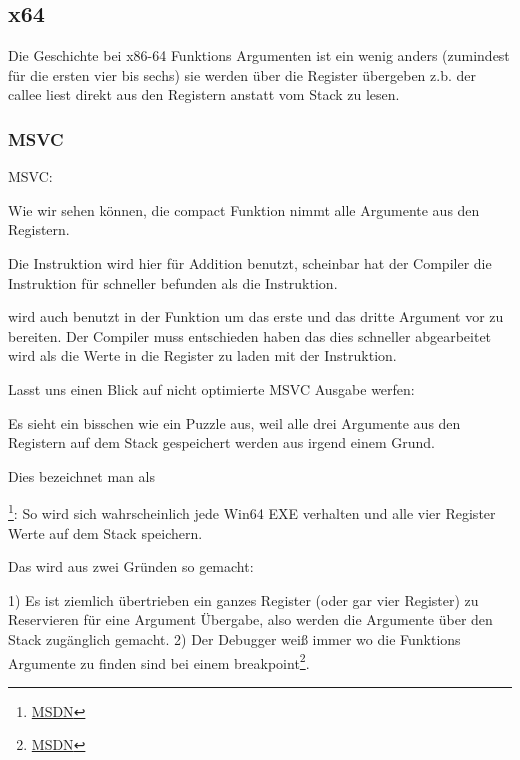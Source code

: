\subsection{x64}


Die Geschichte bei x86-64 Funktions Argumenten ist ein wenig anders (zumindest für die ersten vier bis sechs)
sie werden über die Register übergeben z.b. der \gls{callee} liest direkt aus den Registern anstatt vom Stack 
zu lesen.

\subsubsection{MSVC}

\Optimizing MSVC:



Wie wir sehen können, die compact Funktion \ttf nimmt alle Argumente aus den Registern.

Die \LEA Instruktion wird hier für Addition benutzt,
scheinbar hat der Compiler die Instruktion für schneller befunden als
die  Instruktion.


\LEA wird auch benutzt in der \main Funktion um das erste und das dritte \ttf Argument vor zu bereiten.
Der Compiler muss entschieden haben das dies schneller abgearbeitet wird als die Werte in die Register 
zu laden mit der \MOV Instruktion.

Lasst uns einen Blick auf nicht optimierte MSVC Ausgabe werfen:



Es sieht ein bisschen wie ein Puzzle aus, weil alle drei Argumente aus den Registern auf dem Stack
gespeichert werden aus irgend einem Grund.

\label{shadow_space}
Dies bezeichnet man als 

\footnote{\href{http://go.yurichev.com/17256}{MSDN}}: 
So wird sich wahrscheinlich jede Win64 EXE verhalten und alle vier Register Werte auf dem Stack speichern.

Das wird aus zwei Gründen so gemacht:

1) Es ist ziemlich übertrieben ein ganzes Register (oder gar vier Register) zu Reservieren für eine
Argument Übergabe, also werden die Argumente über den Stack zugänglich gemacht.
2) Der Debugger weiß immer wo die Funktions Argumente zu finden sind bei einem breakpoint\footnote{\href{http://go.yurichev.com/17257}{MSDN}}.


